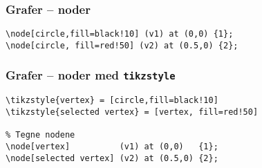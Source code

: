 \documentclass{beamer}
\begin{document}
\begin{frame}[fragile]
\frametitle{Grafer -- noder}

\begin{center}
\end{center}

\begin{Verbatim}[fontsize=\small]
\node[circle,fill=black!10] (v1) at (0,0) {1};
\node[circle, fill=red!50] (v2) at (0.5,0) {2};
\end{Verbatim}

\end{frame}

\begin{frame}[fragile]
\frametitle{Grafer -- noder med \texttt{tikzstyle}}

\begin{center}
\end{center}

\begin{Verbatim}[fontsize=\small]
\tikzstyle{vertex} = [circle,fill=black!10]
\tikzstyle{selected vertex} = [vertex, fill=red!50]

% Tegne nodene
\node[vertex]          (v1) at (0,0)   {1};
\node[selected vertex] (v2) at (0.5,0) {2};
\end{Verbatim}

\end{frame}
\end{document}
